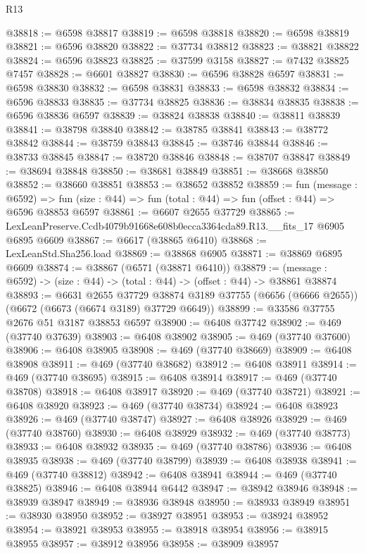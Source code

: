 \begin{lexlean}{R13}
\begin{coremodule}
@38818 := @6598 @38817
@38819 := @6598 @38818
@38820 := @6598 @38819
@38821 := @6596 @38820
@38822 := @37734 @38812
@38823 := @38821 @38822
@38824 := @6596 @38823
@38825 := @37599 @3158
@38827 := @7432 @38825 @7457
@38828 := @6601 @38827
@38830 := @6596 @38828 @6597
@38831 := @6598 @38830
@38832 := @6598 @38831
@38833 := @6598 @38832
@38834 := @6596 @38833
@38835 := @37734 @38825
@38836 := @38834 @38835
@38838 := @6596 @38836 @6597
@38839 := @38824 @38838
@38840 := @38811 @38839
@38841 := @38798 @38840
@38842 := @38785 @38841
@38843 := @38772 @38842
@38844 := @38759 @38843
@38845 := @38746 @38844
@38846 := @38733 @38845
@38847 := @38720 @38846
@38848 := @38707 @38847
@38849 := @38694 @38848
@38850 := @38681 @38849
@38851 := @38668 @38850
@38852 := @38660 @38851
@38853 := @38652 @38852
@38859 := fun (message : @6592) =>
  fun (size : @44) => fun (total : @44) => fun (offset : @44) => @6596 @38853 @6597
@38861 := @6607 @2655 @37729
@38865 := LexLeanPreserve.Ccdb4079b91668e608b0ecca3364cda89.R13.__fits_17 @6905 @6895 @6609
@38867 := @6617 (@38865 @6410)
@38868 := LexLeanStd.Sha256.load
@38869 := @38868 @6905
@38871 := @38869 @6895 @6609
@38874 := @38867 (@6571 (@38871 @6410))
@38879 := (message : @6592) -> (size : @44) -> (total : @44) -> (offset : @44) -> @38861 @38874
@38893 := @6631
    @2655
    @37729
    @38874
    @3189
    @37755
    (@6656 (@6666 @2655))
    (@6672 (@6673 (@6674 @3189) @37729 @6649))
@38899 := @33586 @37755 @2676 @51 @3187 @38853 @6597
@38900 := @6408 @37742
@38902 := @469 (@37740 @37639)
@38903 := @6408 @38902
@38905 := @469 (@37740 @37600)
@38906 := @6408 @38905
@38908 := @469 (@37740 @38669)
@38909 := @6408 @38908
@38911 := @469 (@37740 @38682)
@38912 := @6408 @38911
@38914 := @469 (@37740 @38695)
@38915 := @6408 @38914
@38917 := @469 (@37740 @38708)
@38918 := @6408 @38917
@38920 := @469 (@37740 @38721)
@38921 := @6408 @38920
@38923 := @469 (@37740 @38734)
@38924 := @6408 @38923
@38926 := @469 (@37740 @38747)
@38927 := @6408 @38926
@38929 := @469 (@37740 @38760)
@38930 := @6408 @38929
@38932 := @469 (@37740 @38773)
@38933 := @6408 @38932
@38935 := @469 (@37740 @38786)
@38936 := @6408 @38935
@38938 := @469 (@37740 @38799)
@38939 := @6408 @38938
@38941 := @469 (@37740 @38812)
@38942 := @6408 @38941
@38944 := @469 (@37740 @38825)
@38946 := @6408 @38944 @6442
@38947 := @38942 @38946
@38948 := @38939 @38947
@38949 := @38936 @38948
@38950 := @38933 @38949
@38951 := @38930 @38950
@38952 := @38927 @38951
@38953 := @38924 @38952
@38954 := @38921 @38953
@38955 := @38918 @38954
@38956 := @38915 @38955
@38957 := @38912 @38956
@38958 := @38909 @38957

\end{coremodule}
\end{lexlean}
